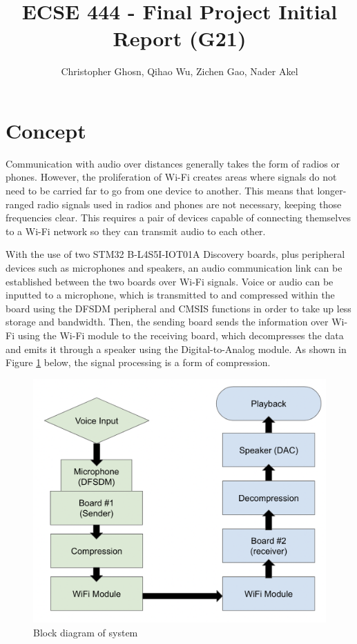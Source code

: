\documentclass[journal]{IEEEtran}
\begin{document}
\title{ECSE 444 - Final Project Initial Report (G21)}

\author{Christopher Ghosn, Qihao Wu, Zichen Gao, Nader Akel}

\maketitle

\section{Concept}
Communication with audio over distances generally takes the form of radios or phones. However, the proliferation of Wi-Fi creates areas where signals do not need to be carried far to go from one device to another. This means that longer-ranged radio signals used in radios and phones are not necessary, keeping those frequencies clear. This requires a pair of devices capable of connecting themselves to a Wi-Fi network so they can transmit audio to each other. 

With the use of two STM32 B-L4S5I-IOT01A Discovery boards, plus peripheral devices such as microphones and speakers, an audio communication link can be established between the two boards over Wi-Fi signals. Voice or audio can be inputted to a microphone, which is transmitted to and compressed within the board using the DFSDM peripheral and CMSIS functions in order to take up less storage and bandwidth. Then, the sending board sends the information over Wi-Fi using the Wi-Fi module to the receiving board, which decompresses the data and emits it through a speaker using the Digital-to-Analog module. As shown in Figure \ref{fig:block} below, the signal processing is a form of compression.

\begin{figure}[H]
    \centering
    \includegraphics[width=0.9\linewidth]{Screen_Shot_2023-11-17_at_11.38.50_PM.png}
    \caption{Block diagram of system}
    \label{fig:block}
\end{figure}
\end{document}
